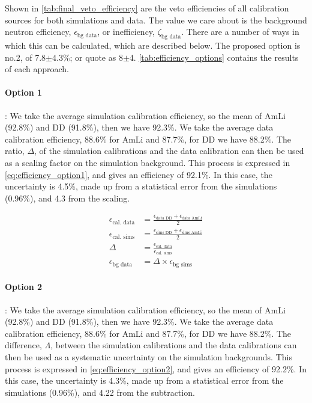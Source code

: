Shown in \autoref{tab:final_veto_efficiency} are the veto efficiencies of all calibration sources for both simulations and data.
The value we care about is the background neutron efficiency, $\epsilon_{\textrm{bg data}}$, or inefficiency, $\zeta_{\textrm{bg data}}$.
There are a number of ways in which this can be calculated, which are described below.
The proposed option is no.2, of 7.8$\pm$4.3\%; or quote as 8$\pm$4.
\autoref{tab:efficiency_options} contains the results of each approach.

\paragraph{Option 1}:
We take the average simulation calibration efficiency, so the mean of AmLi (92.8\%) and DD (91.8\%), then we have 92.3\%.
We take the average data calibration efficiency, 88.6\% for AmLi and 87.7\%, for DD we have 88.2\%.
The ratio, $\Delta$, of the simulation calibrations and the data calibration can then be used as a scaling factor on the simulation background.
This process is expressed in \autoref{eq:efficiency_option1}, and gives an efficiency of 92.1\%.
In this case, the uncertainty is 4.5\%, made up from a statistical error from the simulations (0.96\%), and 4.3 from the scaling.

\begin{align}
	\epsilon_{\textrm{cal. data}} & = \frac{\epsilon_{\textrm{data DD}} + \epsilon_{\textrm{data AmLi}}}{2} \\
	\epsilon_{\textrm{cal. sims}} & = \frac{\epsilon_{\textrm{sims DD}} + \epsilon_{\textrm{sims AmLi}}}{2} \\
	\Delta                        & = \frac{\epsilon_{\textrm{cal. data}}}{\epsilon_{\textrm{cal. sims}}}   \\
	\epsilon_{\textrm{bg data}}   & = \Delta \times \epsilon_{\textrm{bg sims}}
	\label{eq:efficiency_option1}
\end{align}

\paragraph{Option 2}:
We take the average simulation calibration efficiency, so the mean of AmLi (92.8\%) and DD (91.8\%), then we have 92.3\%.
We take the average data calibration efficiency, 88.6\% for AmLi and 87.7\%, for DD we have 88.2\%.
The difference, $\Lambda$, between the simulation calibrations and the data calibrations can then be used as a systematic uncertainty on the simulation backgrounds.
This process is expressed in \autoref{eq:efficiency_option2}, and gives an efficiency of 92.2\%.
In this case, the uncertainty is 4.3\%, made up from a statistical error from the simulations (0.96\%), and 4.22 from the subtraction.

